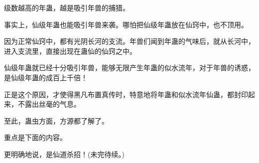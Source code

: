 \begin{this_body}
级数越高的年蛊，越是吸引年兽的捕猎。

事实上，仙级年蛊也能吸引年兽来袭。哪怕把仙级年蛊放在仙窍中，也不顶用。

因为正常仙窍中，都有光阴长河的支流。年兽们闻到年蛊的气味后，就从长河中，进入支流里，直接出现在蛊仙的仙窍之中。

仙级年蛊就已经十分吸引年兽，能够无限产生年蛊的似水流年，对于年兽的诱惑，是仙级年蛊的成百上千倍！

正是这个原因，才使得黑凡布置真传时，特意地将年蛊和似水流年仙蛊，都封印起来，不露出丝毫的气息。

至此，蛊虫方面，方源都了解了。

重点是下面的内容。

更明确地说，是仙道杀招！(未完待续。)

\end{this_body}

